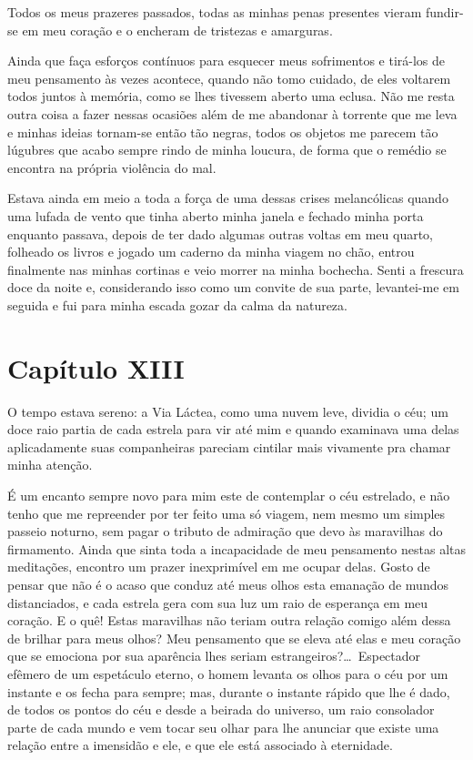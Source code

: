  Todos os meus prazeres passados, todas as minhas penas presentes vieram
fundir-se em meu coração e o encheram de tristezas e amarguras.

 Ainda que faça esforços contínuos para esquecer meus sofrimentos e
tirá-los de meu pensamento às vezes acontece, quando não tomo cuidado,
de eles voltarem todos juntos à memória, como se lhes tivessem aberto
uma eclusa. Não me resta outra coisa a fazer nessas ocasiões além de me
abandonar à torrente que me leva e minhas ideias tornam-se então tão
negras, todos os objetos me parecem tão lúgubres que acabo sempre rindo
de minha loucura, de forma que o remédio se encontra na própria
violência do mal.

 Estava ainda em meio a toda a força de uma dessas crises melancólicas
quando uma lufada de vento que tinha aberto minha janela e fechado
minha porta enquanto passava, depois de ter dado algumas outras voltas
em meu quarto, folheado os livros e jogado um caderno da minha viagem
no chão, entrou finalmente nas minhas cortinas e veio morrer na minha
bochecha. Senti a frescura doce da noite e, considerando isso como um
convite de sua parte, levantei-me em seguida e fui para minha escada
gozar da calma da natureza. 

 \section{Capítulo XIII}

 O tempo estava sereno: a Via Láctea, como uma nuvem leve, dividia o
céu; um doce raio partia de cada estrela para vir até mim e quando
examinava uma delas aplicadamente suas companheiras pareciam cintilar
mais vivamente pra chamar minha atenção.

 É um encanto sempre novo para mim este de contemplar o céu estrelado, e
não tenho que me repreender por ter feito uma só viagem, nem mesmo um
simples passeio noturno, sem pagar o tributo de admiração que devo às
maravilhas do firmamento. Ainda que sinta toda a incapacidade de meu
pensamento nestas altas meditações, encontro um prazer inexprimível em
me ocupar delas. Gosto de pensar que não é o acaso que conduz até meus
olhos esta emanação de mundos distanciados, e cada estrela gera com sua
luz um raio de esperança em meu coração. E o quê! Estas maravilhas não
teriam outra relação comigo além dessa de brilhar para meus olhos? Meu
pensamento que se eleva até elas e meu coração que se emociona por sua
aparência lhes seriam estrangeiros?\ldots\ Espectador efêmero de um
espetáculo eterno, o homem levanta os olhos para o céu por um instante
e os fecha para sempre; mas, durante o instante rápido que lhe é dado,
de todos os pontos do céu e desde a beirada do universo, um raio
consolador parte de cada mundo e vem tocar seu olhar para lhe anunciar
que existe uma relação entre a imensidão e ele, e que ele está
associado à eternidade.

